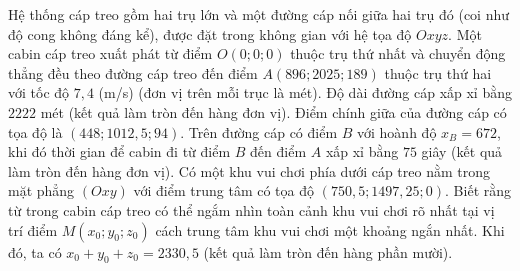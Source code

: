 \begin{ex}
Hệ thống cáp treo gồm hai trụ lớn và một đường cáp nối giữa hai trụ đó (coi như độ cong không đáng kể), được đặt trong không gian với hệ tọa độ $Oxyz$. Một cabin cáp treo xuất phát từ điểm $O(0;0;0)$ thuộc trụ thứ nhất và chuyển động thẳng đều theo đường cáp treo đến điểm $A(896;2025;189)$ thuộc trụ thứ hai với tốc độ $7{,}4$ (m/s) (đơn vị trên mỗi trục là mét).
\choiceTF
{\True Độ dài đường cáp xấp xỉ bằng $2222$ mét (kết quả làm tròn đến hàng đơn vị).}
{Điểm chính giữa của đường cáp có tọa độ là $(448;1012{,}5;94)$.}
{\True Trên đường cáp có điểm $B$ với hoành độ $x_B=672$, khi đó thời gian để cabin đi từ điểm $B$ đến điểm $A$ xấp xỉ bằng $75$ giây (kết quả làm tròn đến hàng đơn vị).}
{Có một khu vui chơi phía dưới cáp treo nằm trong mặt phẳng $(Oxy)$ với điểm trung tâm có tọa độ $(750{,}5;1497{,}25;0)$. Biết rằng từ trong cabin cáp treo có thể ngắm nhìn toàn cảnh khu vui chơi rõ nhất tại vị trí điểm $M(x_0;y_0;z_0)$ cách trung tâm khu vui chơi một khoảng ngắn nhất. Khi đó, ta có $x_0+y_0+z_0=2330{,}5$ (kết quả làm tròn đến hàng phần mười).}
\end{ex}
